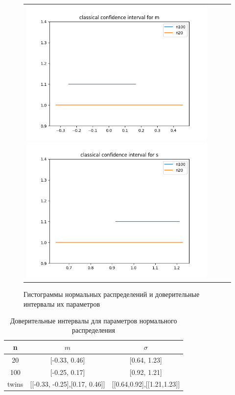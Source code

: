 \begin{figure}[H]
\begin{tabular}{cccc}
		\includegraphics[scale=0.3]{classic_m.png}
		\includegraphics[scale=0.3]{classic_s.png}
	\end{tabular}
	\caption{Гистограммы нормальных распределений и доверительные интервалы их параметров}
\end{figure}

\begin{table}[H]
	\begin{center}
		\begin{tabular}{|c|c|c|}
			\hline 
			n & $m$ & $\sigma$ \\
			\hline \hline 
			20 & [-0.33, 0.46] & [0.64, 1.23] \\
			\hline 
			100 & [-0.25, 0.17] & [0.92, 1.21] \\
			\hline
			twins & [[-0.33, -0.25],[0.17, 0.46]]& [[0.64,0.92],[[1.21,1.23]] \\
			\hline 
		\end{tabular}
	\end{center}
	\caption{Доверительные интервалы для параметров нормального распределения}
\end{table} 

